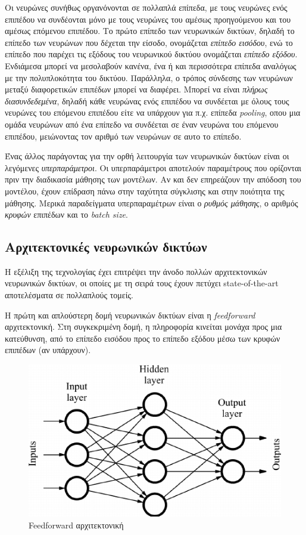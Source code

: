\medskip
Οι νευρώνες συνήθως οργανόνονται σε πολλαπλά επίπεδα, με τους νευρώνες ενός επιπέδου να συνδέονται μόνο με τους νευρώνες του αμέσως προηγούμενου και του αμέσως επόμενου επιπέδου. Το πρώτο επίπεδο των νευρωνικών δικτύων, δηλαδή το επίπεδο των νευρώνων που δέχεται την είσοδο, ονομάζεται \textit{επίπεδο εισόδου}, ενώ το επίπεδο που παρέχει τις εξόδους του νευρωνικού δικτύου ονομάζεται \textit{επίπεδο εξόδου}. Ενδιάμεσα μπορεί να μεσολαβούν κανένα, ένα ή και περισσότερα επίπεδα αναλόγως με την πολυπλοκότητα του δικτύου. Παράλληλα, ο τρόπος σύνδεσης των νευρώνων μεταξύ διαφορετικών επιπέδων μπορεί να διαφέρει. Μπορεί να είναι \textit{πλήρως διασυνδεδεμένα}, δηλαδή κάθε νευρώνας ενός επιπέδου να συνδέεται με όλους τους νευρώνες του επόμενου επιπέδου είτε να υπάρχουν για π.χ. επίπεδα \textit{pooling}, οπου μια ομάδα νευρώνων από ένα επίπεδο να συνδέεται σε έναν νευρώνα του επόμενου επιπέδου, μειώνοντας τον αριθμό των νευρώνων σε αυτο το επίπεδο.

\medskip
Ένας άλλος παράγοντας για την ορθή λειτουργία των νευρωνικών δικτύων είναι οι λεγόμενες \textit{υπερπαράμετροι}. Οι υπερπαράμετροι αποτελούν παραμέτρους που ορίζονται πριν την διαδικασία μάθησης των μοντέλων. Αν και δεν επηρεάζουν την απόδοση του μοντέλου, έχουν επίδραση πάνω στην ταχύτητα σύγκλισης και στην ποιότητα της μάθησης. Μερικά παραδείγματα υπερπαραμέτρων είναι ο \textit{ρυθμός μάθησης}, ο αριθμός \textit{κρυφών} επιπέδων και το \textit{batch size}.

\subsection{Αρχιτεκτονικές νευρωνικών δικτύων}

Η εξέλιξη της τεχνολογίας έχει επιτρέψει την άνοδο πολλών αρχιτεκτονικών νευρωνικών δικτύων, οι οποίες με τη σειρά τους έχουν πετύχει state-of-the-art αποτελέσματα σε πολλαπλούς τομείς.

Η πρώτη και απλούστερη δομή νευρωνικών δικτύων είναι η \textit{feedfor\-ward} αρχιτεκτονική. Στη συγκεκριμένη δομή, η πληροφορία κινείται μονάχα προς μια κατεύθυνση, από το επίπεδο εισόδου προς το επίπεδο εξόδου μέσω των κρυφών επιπέδων (αν υπάρχουν).

\medskip
\begin{figure}[h]
  \centering
  \includegraphics[scale=0.7]{images/Feedforward.jpg}
  \caption{Feedforward αρχιτεκτονική}
  \label{fig:feedforward}
\end{figure}

